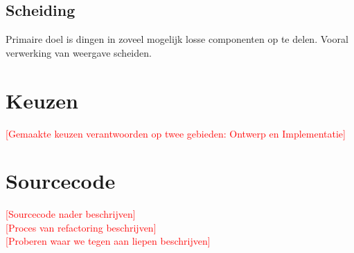 \documentclass[a4paper]{article}
\newcommand{\todo}[1]{\textcolor{red}{[#1]}}
\begin{document}
\subsection{Scheiding}
Primaire doel is dingen in zoveel mogelijk losse componenten op te delen.
Vooral verwerking van weergave scheiden.

\section{Keuzen}
\todo{Gemaakte keuzen verantwoorden op twee gebieden: Ontwerp en Implementatie}


\section{Sourcecode}
\todo{Sourcecode nader beschrijven}
\\
\todo{Proces van refactoring beschrijven}
\\
\todo{Proberen waar we tegen aan liepen beschrijven}
\end{document}

